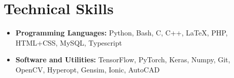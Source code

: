 \section*{Technical Skills}
\begin{itemize}

\setlength\itemsep{0pt}
\item \textbf{Programming Languages:} Python, Bash, C, C++, \LaTeX, PHP, HTML+CSS, MySQL, Typescript
\item \textbf{Software and Utilities:} TensorFlow, PyTorch, Keras, Numpy, Git, OpenCV, Hyperopt, Gensim, Ionic, AutoCAD

\end{itemize}
